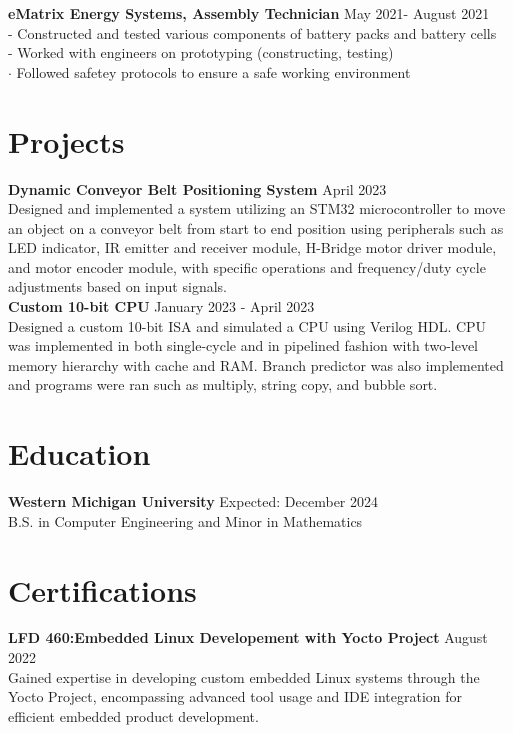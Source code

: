 \documentclass[a4paper,10pt]{article}
\begin{document}
\vspace{-.5cm} \noindent \textbf{eMatrix Energy Systems, Assembly Technician}
\hfill May 2021- August 2021\\ - Constructed and tested various components of
battery packs and battery cells\\ - Worked with engineers on prototyping (constructing, testing)\\
$\cdot$ Followed safetey protocols to ensure a safe working environment
\vspace{-.5cm} \section*{Projects} \textbf{Dynamic Conveyor Belt Positioning
System} \hfill April 2023\\ Designed and implemented a system utilizing an STM32
microcontroller to move an object on a conveyor belt from start to end position
using peripherals such as LED indicator, IR emitter and receiver module,
H-Bridge motor driver module, and motor encoder module, with specific operations
and frequency/duty cycle adjustments based on input signals. \noindent\\
\textbf{Custom 10-bit CPU} \hfill January 2023 - April 2023\\ Designed a custom
10-bit ISA and simulated a CPU using Verilog HDL. CPU was implemented in both
single-cycle and in pipelined fashion with two-level memory hierarchy with cache
and RAM. Branch predictor was also implemented and programs were ran such as
multiply, string copy, and bubble sort.\\

\vspace{-.25cm}
\section*{Education} \textbf{Western Michigan University} \hfill Expected:
December 2024\\ B.S. in Computer Engineering and Minor
in Mathematics\\ 


\section*{Certifications} \textbf{LFD 460:Embedded Linux Developement with Yocto
Project} \hfill August 2022\\ \vspace{-.5cm}\vspace{.5cm}
Gained expertise in developing custom embedded Linux systems through the Yocto Project, encompassing advanced tool usage and IDE integration for efficient embedded product development.
\end{document}

